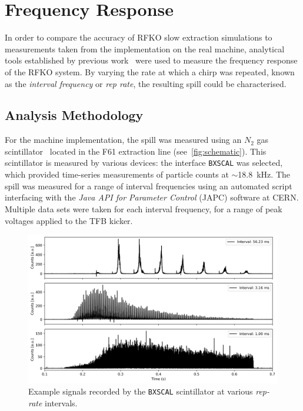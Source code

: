 \documentclass[a4paper,twoside,11pt]{report}
\begin{document}
\clearpage
\section{Frequency Response}\label{results:freq_response}

In order to compare the accuracy of RFKO slow extraction simulations to measurements taken from the implementation on the real machine, analytical tools established by previous work~\cite{Pari:2780495} were used to measure the frequency response of the RFKO system. By varying the rate at which a chirp was repeated, known as the \textit{interval frequency} or \textit{rep rate}, the resulting spill could be characterised. 

\subsection{Analysis Methodology}\label{sec:machine_freq_anal_method}

For the machine implementation, the spill was measured using an $N_2$ gas scintillator~\cite{Actis:bxscint} located in the F61 extraction line (see~\autoref{fig:schematic}). This scintillator is measured by various devices: the interface \verb|BXSCAL| was selected, which provided time-series measurements of particle counts at $\sim$\qty{18.8}{\kilo\hertz}. The spill was measured for a range of interval frequencies using an automated script interfacing with the \textit{Java API for Parameter Control} (JAPC) software at CERN. Multiple data sets were taken for each interval frequency, for a range of peak voltages applied to the TFB kicker. 

\begin{figure}
  \centering
  \includegraphics*[width=0.7\linewidth]{raw_signal.png}
  \cprotect\caption{Example signals recorded by the \verb|BXSCAL| scintillator at various \textit{rep-rate} intervals.}\label{fig:raw_signal}
\end{figure}
\end{document}
